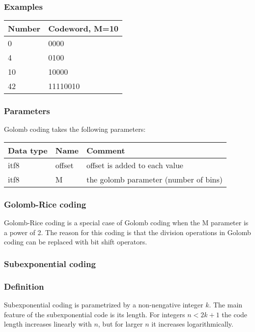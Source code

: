 \documentclass[a4paper]{article}
\begin{document}
\subsubsection*{Examples}

\begin{tabular}{|>{\raggedright}p{76pt}|>{\raggedright}p{107pt}|}
\hline
\textbf{Number} & \textbf{Codeword, M=10}\tabularnewline
\hline
0 & 0000\tabularnewline
\hline
4 & 0100\tabularnewline
\hline
10 & 10000\tabularnewline
\hline
42 & 11110010\tabularnewline
\hline
\end{tabular}

\subsubsection*{Parameters}

Golomb coding takes the following parameters: 

\begin{tabular}{|>{\raggedright}p{144pt}|>{\raggedright}p{144pt}|>{\raggedright}p{144pt}|}
\hline
\textbf{Data type} & \textbf{Name} & \textbf{Comment}\tabularnewline
\hline
itf8 & offset & offset is added to each value\tabularnewline
\hline
itf8 & M & the golomb parameter (number of bins)\tabularnewline
\hline
\end{tabular}

\subsubsection*{Golomb-Rice coding}

Golomb-Rice coding is a special case of Golomb coding when the M parameter is a 
power of 2. The reason for this coding is that the division operations in Golomb 
coding can be replaced with bit shift operators. 

\subsubsection*{Subexponential coding}

\subsubsection*{Definition}

Subexponential coding is parametrized by a non-nengative integer $k$. The 
main feature of the subexponential code is its length. For integers $n < 2k+1$
the code length increases linearly with $n$, but for larger $n$ 
it increases logarithmically.
\end{document}
